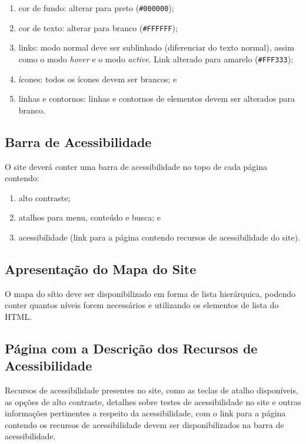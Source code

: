 \documentclass[
  12pt,
  openright,
  twoside,
  a4paper,
  english,
  french,
  spanish,
  brazil
]{abntex2}
\begin{document}
\begin{enumerate}
  \item cor de fundo: alterar para preto (\texttt{\#000000});
  \item cor de texto: alterar para branco (\texttt{\#FFFFFF});
  \item
    links: modo normal deve ser sublinhado (diferenciar do texto normal), assim
    como o modo \textit{hover} e o modo \textit{active}. Link alterado para
    amarelo (\texttt{\#FFF333});
  \item ícones: todos os ícones devem ser brancos; e
  \item
    linhas e contornos: linhas e contornos de elementos devem ser alterados para
    branco.
\end{enumerate}

\subsection{Barra de Acessibilidade}

O site deverá conter uma barra de acessibilidade no topo de cada página
contendo:

\begin{enumerate}
  \item alto contraste;
  \item atalhos para menu, conteúdo e busca; e
  \item
    acessibilidade (link para a página contendo recursos de acessibilidade do
    site).
\end{enumerate}

\subsection{Apresentação do Mapa do Site}

O mapa do sítio deve ser disponibilizado em forma de lista hierárquica, podendo
conter quantos níveis forem necessários e utilizando os elementos de lista do
HTML.

\subsection{Página com a Descrição dos Recursos de Acessibilidade}

Recursos de acessibilidade presentes no site, como as teclas de atalho
disponíveis, as opções de alto contraste, detalhes sobre testes de
acessibilidade no site e outras informações pertinentes a respeito da
acessibilidade, com o link para a página contendo os recursos de acessibilidade
devem ser disponibilizados na barra de acessibilidade.
\end{document}
